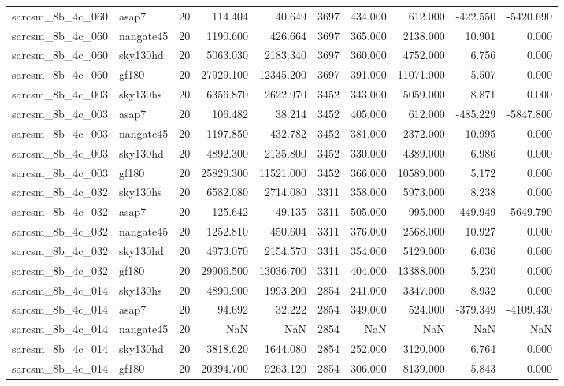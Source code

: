 \begin{tabular}{llrrrrrrrr}
sarcsm\_8b\_4c\_060 & asap7 & 20 & 114.404 & 40.649 & 3697 & 434.000 & 612.000 & -422.550 & -5420.690 \\
sarcsm\_8b\_4c\_060 & nangate45 & 20 & 1190.600 & 426.664 & 3697 & 365.000 & 2138.000 & 10.901 & 0.000 \\
sarcsm\_8b\_4c\_060 & sky130hd & 20 & 5063.030 & 2183.340 & 3697 & 360.000 & 4752.000 & 6.756 & 0.000 \\
sarcsm\_8b\_4c\_060 & gf180 & 20 & 27929.100 & 12345.200 & 3697 & 391.000 & 11071.000 & 5.507 & 0.000 \\
sarcsm\_8b\_4c\_003 & sky130hs & 20 & 6356.870 & 2622.970 & 3452 & 343.000 & 5059.000 & 8.871 & 0.000 \\
sarcsm\_8b\_4c\_003 & asap7 & 20 & 106.482 & 38.214 & 3452 & 405.000 & 612.000 & -485.229 & -5847.800 \\
sarcsm\_8b\_4c\_003 & nangate45 & 20 & 1197.850 & 432.782 & 3452 & 381.000 & 2372.000 & 10.995 & 0.000 \\
sarcsm\_8b\_4c\_003 & sky130hd & 20 & 4892.300 & 2135.800 & 3452 & 330.000 & 4389.000 & 6.986 & 0.000 \\
sarcsm\_8b\_4c\_003 & gf180 & 20 & 25829.300 & 11521.000 & 3452 & 366.000 & 10589.000 & 5.172 & 0.000 \\
sarcsm\_8b\_4c\_032 & sky130hs & 20 & 6582.080 & 2714.080 & 3311 & 358.000 & 5973.000 & 8.238 & 0.000 \\
sarcsm\_8b\_4c\_032 & asap7 & 20 & 125.642 & 49.135 & 3311 & 505.000 & 995.000 & -449.949 & -5649.790 \\
sarcsm\_8b\_4c\_032 & nangate45 & 20 & 1252.810 & 450.604 & 3311 & 376.000 & 2568.000 & 10.927 & 0.000 \\
sarcsm\_8b\_4c\_032 & sky130hd & 20 & 4973.070 & 2154.570 & 3311 & 354.000 & 5129.000 & 6.036 & 0.000 \\
sarcsm\_8b\_4c\_032 & gf180 & 20 & 29906.500 & 13036.700 & 3311 & 404.000 & 13388.000 & 5.230 & 0.000 \\
sarcsm\_8b\_4c\_014 & sky130hs & 20 & 4890.900 & 1993.200 & 2854 & 241.000 & 3347.000 & 8.932 & 0.000 \\
sarcsm\_8b\_4c\_014 & asap7 & 20 & 94.692 & 32.222 & 2854 & 349.000 & 524.000 & -379.349 & -4109.430 \\
sarcsm\_8b\_4c\_014 & nangate45 & 20 & NaN & NaN & 2854 & NaN & NaN & NaN & NaN \\
sarcsm\_8b\_4c\_014 & sky130hd & 20 & 3818.620 & 1644.080 & 2854 & 252.000 & 3120.000 & 6.764 & 0.000 \\
sarcsm\_8b\_4c\_014 & gf180 & 20 & 20394.700 & 9263.120 & 2854 & 306.000 & 8139.000 & 5.843 & 0.000 \\

\end{tabular}
